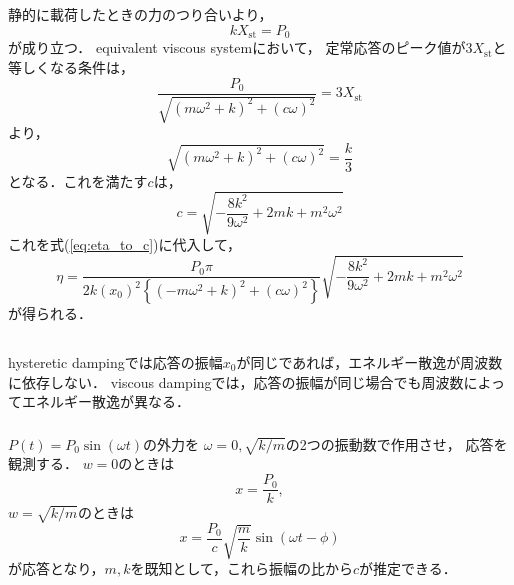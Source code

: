 \documentclass[a4paper]{jsarticle}
\begin{document}
\subsection{}
静的に載荷したときの力のつり合いより，
\begin{equation}
  k X_{\mathrm{st}} = P_0
\end{equation}
が成り立つ．
equivalent viscous systemにおいて，
定常応答のピーク値が$3 X_{\mathrm{st}}$と等しくなる条件は，
\begin{equation}
  \frac{P_0}{\sqrt{(m \omega^2 + k)^2 + (c \omega)^2}} = 3 X_{\mathrm{st}}
\end{equation}
より，
\begin{equation}
  \sqrt{(m \omega^2 + k)^2 + (c \omega)^2} = \frac{k}{3}
\end{equation}
となる．これを満たす$c$は，
\begin{equation}
  c = \sqrt{-\frac{8k^2}{9 \omega^2} + 2 m k + m^2 \omega^2}
\end{equation}
これを式(\ref{eq:eta_to_c})に代入して，
\begin{equation}
  \eta = \frac{P_0 \pi}{2 k \left(x_0\right)^2
    \left\{(-m \omega^2 + k)^2 + (c \omega)^2\right\}}
  \sqrt{-\frac{8k^2}{9\omega^2} + 2mk + m^2 \omega^2}
\end{equation}
が得られる．

\subsection{}
\subsubsection{}
hysteretic dampingでは応答の振幅$x_0$が同じであれば，エネルギー散逸が周波数に依存しない．
viscous dampingでは，応答の振幅が同じ場合でも周波数によってエネルギー散逸が異なる．
\subsubsection{}
$P(t) = P_0 \sin (\omega t)$の外力を
$\omega = 0, \sqrt{k / m}$の2つの振動数で作用させ，
応答を観測する．
$w = 0$のときは
\begin{equation}
  x = \frac{P_0}{k},
\end{equation}
$w = \sqrt{k / m}$のときは
\begin{equation}
  x =\frac{P_0}{c}\sqrt{\frac{m}{k}} \sin (\omega t - \phi)
\end{equation}
が応答となり，$m, k$を既知として，これら振幅の比から$c$が推定できる．
\end{document}
